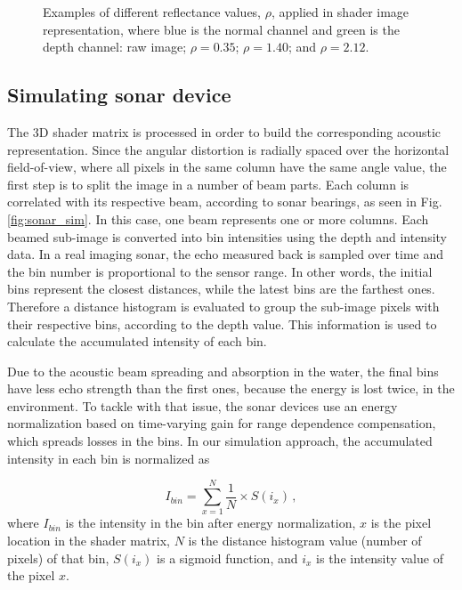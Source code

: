 \documentclass[final,5p,times]{elsarticle}
\begin{document}
\begin{figure}[h]
{        \label{fig:reflectance:2.12}
    }
    \captionsetup{justification=centering}
    \caption{Examples of different reflectance values, $\rho$, applied in
    shader image representation, where blue is the normal channel and
    green is the depth channel:  raw image;
     $\rho = 0.35$;
     $\rho = 1.40$; and
     $\rho = 2.12$.}
    \label{fig:sonar_reflectances}
\end{figure}



\subsection{Simulating sonar device}
\label{dev:sonardata}

The 3D shader matrix is processed in order to build the corresponding
acoustic representation. Since the angular distortion is radially spaced
over the horizontal field-of-view, where all pixels in the same column
have the same angle value, the first step is to split the image in a
number of beam parts. Each column is correlated with its respective beam,
according to sonar bearings, as seen in Fig. \ref{fig:sonar_sim}. In this
case, one beam represents one or more columns. Each
beamed sub-image is converted into bin intensities using the depth and
intensity data. In a real imaging sonar, the echo measured back is sampled
over time and the bin number is proportional to the sensor range. In other
words, the initial bins represent the closest distances, while the latest
bins are the farthest ones. Therefore a distance histogram is evaluated to
group the sub-image pixels with their respective bins, according to the
depth value. This information is used to calculate the accumulated
intensity of each bin.

Due to the acoustic beam spreading and absorption in the water, the final
bins have less echo strength than the first ones, because the energy is
lost twice, in the environment. To tackle with that issue, the sonar devices
use an energy normalization based on time-varying gain for range dependence
compensation, which spreads losses in the bins. In our simulation approach,
the accumulated intensity in each bin is normalized as

\begin{equation}
    \label{eq:1}
    I_{bin} = \sum\limits_{x=1}^N \frac{1}{N} \times S(i_{x}) \, ,
\end{equation}
where $I_{bin}$ is the intensity in the bin after energy normalization,
$x$ is the pixel location in the shader matrix, $N$ is the distance histogram
value (number of pixels) of that bin, $S(i_{x})$ is a sigmoid function,
and $i_{x}$ is the intensity value of the pixel $x$.
\end{document}
